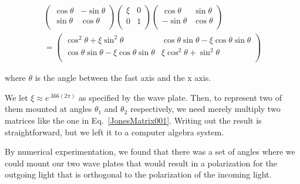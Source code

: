 \begin{multline}
\begin{pmatrix}
\cos\theta & - \sin \theta \\
\sin \theta & \cos\theta \\
\end{pmatrix}
\begin{pmatrix}
\xi & 0 \\
0 & 1 \\
\end{pmatrix}
\begin{pmatrix}
\cos\theta &  \sin \theta \\
-\sin \theta & \cos\theta \\
\end{pmatrix} \\
=
\begin{pmatrix}
\cos ^2 \theta+\xi \sin^2 \theta &  \cos\theta \sin \theta-\xi \cos\theta \sin \theta \\
\cos\theta \sin \theta-\xi \cos \theta \sin\theta & \xi \cos^2 \theta + \sin^2 \theta \\ \label{JonesMatrix001}
\end{pmatrix}
\end{multline}

where $\theta$ is the angle between the fast axis and the x axis. 

We let $\xi\approx e^{.366 (2 \pi)}$ as specified by the wave plate. Then, to represent two of them mounted at angles $\theta_1$ and $\theta_2$ respectively, we need merely multiply two matrices like the one in Eq.\ \ref{JonesMatrix001}. Writing out the result is straightforward, but we left it to a computer algebra system.

By numerical experimentation, we found that there was a set of angles where we could mount our two wave plates that would result in a polarization for the outgoing light that is orthogonal to the polarization of the incoming light. 

